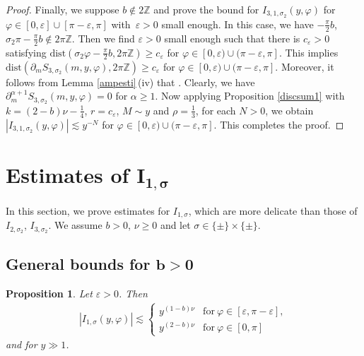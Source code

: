 \documentclass[10pt,a4paper]{amsart}
\numberwithin{equation}{section}
\newtheorem{Proposition}[Theorem]{Proposition}
 { \theoremstyle{definition}
\newtheorem{Definition}[Theorem]{Definition}
\newtheorem{Note}[Theorem]{Note}
\newtheorem{Example}[Theorem]{Example}
\newtheorem{Remark}[Theorem]{Remark} }
\def\a{\alpha}
\def\e{\varepsilon}
\def\f{\varphi}
\def\n{\nu}
\def\s{\sigma}
\def\z{\zeta}
\def\pa{\partial}
\begin{document}
\begin{proof}
Finally, we suppose $b\notin 2\mathbb{Z}$ and prove the bound for $I_{3,1,\s_2}(y,\f)$ for $\f\in [0,\e]\cup [\pi-\e,\pi]$ with~${\e>0}$ small enough. In this case, we have
$
-\frac{\pi}{2}b$, $ \s_2\pi-\frac{\pi}{2}b\notin 2\pi \mathbb{Z}$.
Then we find $\e>0$ small enough such that there is $c_{\e}>0$ satisfying $\mathrm{dist}(\s_2\f-\frac{\pi}{2}b,2\pi\mathbb{Z})\geq c_{\e}$ for $\f\in [0,\e)\cup (\pi-\e,\pi]$. This implies $\mathrm{dist}(\pa_mS_{3,\s_2}(m,y,\f), 2\pi\mathbb{Z})\geq c_{\e}$ for $\f\in [0,\e)\cup (\pi-\e,\pi]$. Moreover, it follows from Lemma \ref{ampesti}\,(iv) that \smash{$|\pa_{m}^{\a}\z_{3,1,\s_2}(m,y,\f)|\lesssim y^{(2-b)\n-\frac{1}{4}-\frac{\a}{3}}$}. Clearly, we have $\pa_m^{\a+1}S_{3,\s_2}(m,y,\f)=0$ for $\a\geq 1$.
Now applying Proposition \ref{discsum1} with $k=(2-b)\n-\frac{1}{4}$, $r=c_{\e}$, $M\sim y$ and $\rho=\frac{1}{3}$, for each $N>0$, we obtain
$
|I_{3,1,\s_2}(y,\f)|\lesssim y^{-N}$ for $\f\in [0,\e)\cup (\pi-\e,\pi]$.
This completes the proof.
\end{proof}

\section[Estimates of I\_\{1,s\}]{Estimates of $\boldsymbol{ I_{1,\s}}$}


In this section, we prove estimates for $I_{1,\s}$, which are more delicate than those of $I_{2,\s_2}$, $I_{3,\s_2}$.
We assume $b>0$, $\n\geq 0$ and let $\s\in \{\pm\}\times \{\pm\}$.

\subsection[General bounds for b>0]{General bounds for $\boldsymbol{b>0}$}

\begin{Proposition}\label{I_1prop}
Let $\e>0$. Then
\begin{align*}
|I_{1,\s}(y,\f)|\lesssim \begin{cases}
y^{(1-b)\n}& \text{for}\  \f\in [\e,\pi-\e], \\
y^{(2-b)\n}& \text{for}\  \f\in [0,\pi]
\end{cases}
\end{align*}
and for $y\gg 1$.
\end{Proposition}
\end{document}
